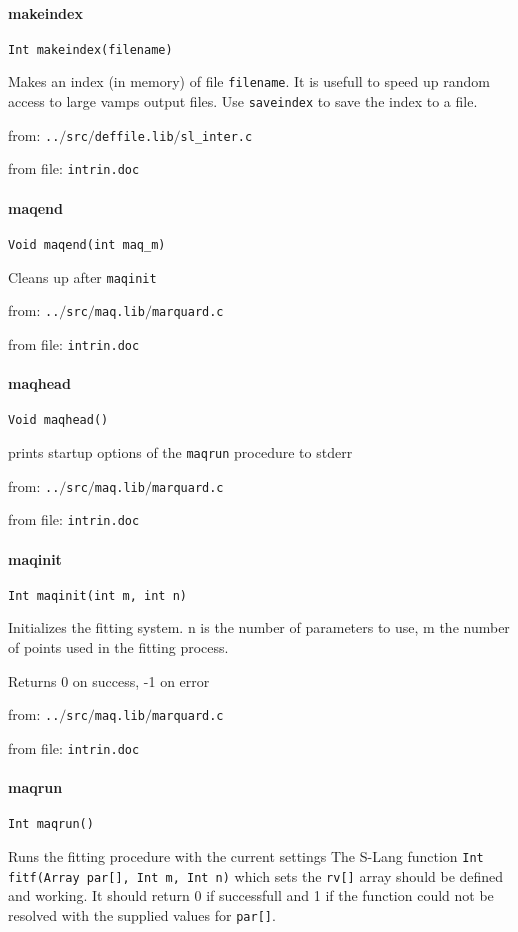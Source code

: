 \paragraph{makeindex}
\begin{verbatim}
Int makeindex(filename)
\end{verbatim}
Makes an index (in memory) of file {\tt filename}. It is usefull
to speed up random access to large vamps output files. Use
{\tt saveindex} to save the index to a file.


from: {\tt ..$/$src$/$deffile.lib$/$sl\_inter.c}

from file: {\tt intrin.doc}


\paragraph{maqend}
\begin{verbatim}
Void maqend(int maq_m)
\end{verbatim}
Cleans up after {\tt maqinit}


from: {\tt ..$/$src$/$maq.lib$/$marquard.c}

from file: {\tt intrin.doc}


\paragraph{maqhead}
\begin{verbatim}
Void maqhead()
\end{verbatim}
prints startup options of the {\tt maqrun} procedure to
stderr


from: {\tt ..$/$src$/$maq.lib$/$marquard.c}

from file: {\tt intrin.doc}


\paragraph{maqinit}
\begin{verbatim}
Int maqinit(int m, int n)
\end{verbatim}
Initializes the fitting system. n is the number of
parameters to use, m the number of points used in the
fitting process.


Returns 0 on success, -1 on error


from: {\tt ..$/$src$/$maq.lib$/$marquard.c}

from file: {\tt intrin.doc}


\paragraph{maqrun}
\begin{verbatim}
Int maqrun()
\end{verbatim}
Runs the fitting procedure with the current settings
The S-Lang function {\tt Int fitf(Array par[], Int m, Int n)} which
sets the {\tt rv[]} array should be defined and working. It should return
0 if successfull and 1 if the function could not be resolved with
the supplied values for {\tt par[]}.


